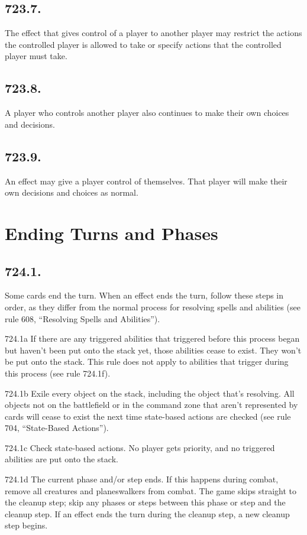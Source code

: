 \subsection*{723.7.}
The effect that gives control of a player to another player may restrict the actions the controlled player is allowed to take or specify actions that the controlled player must take.

\subsection*{723.8.}
A player who controls another player also continues to make their own choices and decisions.

\subsection*{723.9.}
An effect may give a player control of themselves. That player will make their own decisions and choices as normal.

\section{Ending Turns and Phases}
\subsection*{724.1.}
Some cards end the turn. When an effect ends the turn, follow these steps in order, as they differ from the normal process for resolving spells and abilities (see rule 608, “Resolving Spells and Abilities”).

724.1a If there are any triggered abilities that triggered before this process began but haven’t been put onto the stack yet, those abilities cease to exist. They won’t be put onto the stack. This rule does not apply to abilities that trigger during this process (see rule 724.1f).

724.1b Exile every object on the stack, including the object that’s resolving. All objects not on the battlefield or in the command zone that aren’t represented by cards will cease to exist the next time state-based actions are checked (see rule 704, “State-Based Actions”).

724.1c Check state-based actions. No player gets priority, and no triggered abilities are put onto the stack.

724.1d The current phase and/or step ends. If this happens during combat, remove all creatures and planeswalkers from combat. The game skips straight to the cleanup step; skip any phases or steps between this phase or step and the cleanup step. If an effect ends the turn during the cleanup step, a new cleanup step begins.

